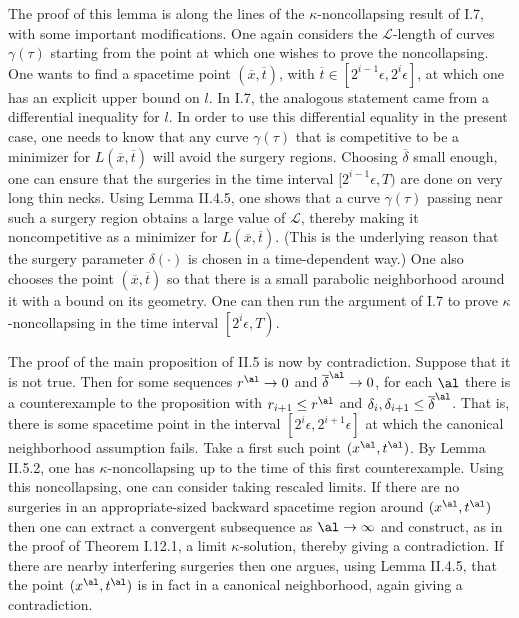 The proof of this
lemma is along the lines of the $\kappa$-noncollapsing result of I.7, with
some important modifications.  One again considers the ${\mathcal L}$-length of curves
$\gamma(\tau)$ starting from the point at which one wishes to prove the
noncollapsing. One wants to find a spacetime point
$(\overline{x}, \overline{t})$, with
$\overline{t} \in [2^{i-1} \epsilon, 2^i \epsilon]$, at which one has
an explicit upper bound on $l$. In I.7, the analogous statement came from
a differential inequality for $l$. In order to use this differential
equality in the present case, one needs to know that any curve $\gamma(\tau)$
that is competitive to be a minimizer for $L(\overline{x}, \overline{t})$
will avoid the surgery regions.
Choosing $\overline{\delta}$ small enough, one can ensure that the
surgeries in the time interval $[2^{i-1} \epsilon, T)$ are done on very
long thin necks. Using Lemma II.4.5, one shows that a curve $\gamma(\tau)$
passing near such a surgery region obtains a large value of ${\mathcal L}$,
thereby making it noncompetitive as a minimizer for
$L(\overline{x}, \overline{t})$. (This is the underlying
reason that the surgery parameter
$\delta(\cdot)$ is chosen in a time-dependent way.)
One also chooses the point
$(\overline{x}, \overline{t})$ so that there is a small parabolic neighborhood
around it with a bound on its geometry. One can then run the argument of
I.7 to prove $\kappa$-noncollapsing in the time interval
$\left[ 2^i \epsilon, T \right)$.

The proof of the main proposition of II.5 is now by contradiction.  Suppose
that it is not true.  Then for some sequences $r^\al \rightarrow 0$ and
$\overline{\delta}^\al \rightarrow 0$, for each $\al$ there is a counterexample to the
proposition with $r_{i+1} \le r^\al$ and $\delta_i, \delta_{i+1} \le
\overline{\delta}^\al$. That is, there is some spacetime point in the interval
$\left[ 2^i \epsilon, 2^{i+1} \epsilon \right]$ at which the
canonical neighborhood assumption fails.  Take a first such point
$(x^\al, t^\al)$.
By Lemma II.5.2, one has $\kappa$-noncollapsing up to the time of this
first counterexample. Using this noncollapsing, one can consider
taking rescaled limits.  If there are no surgeries in an
appropriate-sized backward spacetime region around $(x^\al, t^\al)$
then one can extract a convergent subsequence as $\al \rightarrow \infty$
and construct, as in the proof of Theorem I.12.1, a limit $\kappa$-solution,
thereby giving a contradiction. If there are nearby interfering surgeries
then one argues, using Lemma II.4.5, that the point $(x^\al, t^\al)$ is in fact in a
canonical neighborhood, again giving a contradiction.

